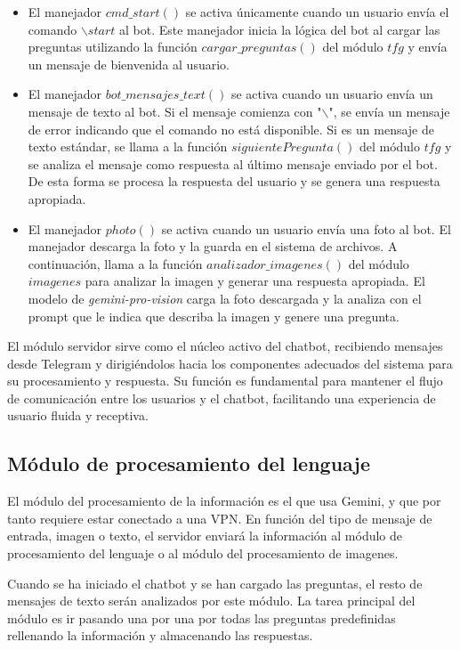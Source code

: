 \begin{itemize}
	\item El manejador $cmd\_start()$ se activa únicamente cuando un usuario envía el comando $\backslash start$ al bot. Este manejador inicia la lógica del bot al cargar las preguntas utilizando la función $cargar\_preguntas()$ del módulo $tfg$ y envía un mensaje de bienvenida al usuario.
	
	\item El manejador $bot\_mensajes\_text()$ se activa cuando un usuario envía un mensaje de texto al bot. Si el mensaje comienza con "$\backslash$", se envía un mensaje de error indicando que el comando no está disponible. Si es un mensaje de texto estándar, se llama a la función $siguientePregunta()$ del módulo $tfg$ y se analiza el mensaje como respuesta al último mensaje enviado por el bot. De esta forma se procesa la respuesta del usuario y se genera una respuesta apropiada.
	
	\item El manejador $photo()$ se activa cuando un usuario envía una foto al bot. El manejador descarga la foto y la guarda en el sistema de archivos. A continuación, llama a la función $analizador\_imagenes()$ del módulo $imagenes$ para analizar la imagen y generar una respuesta apropiada. El modelo de \textit{gemini-pro-vision} carga la foto descargada y la analiza con el prompt que le indica que describa la imagen y genere una pregunta. 
\end{itemize}

El módulo servidor sirve como el núcleo activo del chatbot, recibiendo mensajes desde Telegram y dirigiéndolos hacia los componentes adecuados del sistema para su procesamiento y respuesta. Su función es fundamental para mantener el flujo de comunicación entre los usuarios y el chatbot, facilitando una experiencia de usuario fluida y receptiva. 

\subsection{Módulo de procesamiento del lenguaje}
El módulo del procesamiento de la información es el que usa Gemini, y que por tanto requiere estar conectado a una VPN. En función del tipo de mensaje de entrada, imagen o texto, el servidor enviará la información al módulo de procesamiento del lenguaje o al módulo del procesamiento de imagenes.

Cuando se ha iniciado el chatbot y se han cargado las preguntas, el resto de mensajes de texto serán analizados por este módulo. La tarea principal del módulo es ir pasando una por una por todas las preguntas predefinidas rellenando la información y almacenando las respuestas. 

